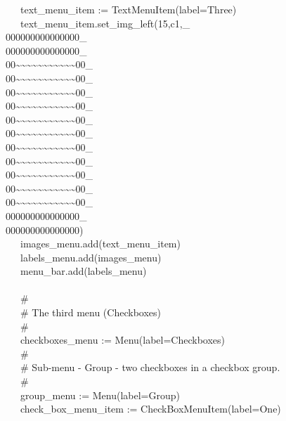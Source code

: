 {\>   \ \ \ text\_menu\_item :=
TextMenuItem({\textquotedbl}label=Three{\textquotedbl}) \\
\>   \ \ \ text\_menu\_item.set\_img\_left({\textquotedbl}15,c1,\_ \\
000000000000000\_ \\
000000000000000\_ \\
00\~{}\~{}\~{}\~{}\~{}\~{}\~{}\~{}\~{}\~{}\~{}00\_ \\
00\~{}\~{}\~{}\~{}\~{}\~{}\~{}\~{}\~{}\~{}\~{}00\_ \\
00\~{}\~{}\~{}\~{}\~{}\~{}\~{}\~{}\~{}\~{}\~{}00\_ \\
00\~{}\~{}\~{}\~{}\~{}\~{}\~{}\~{}\~{}\~{}\~{}00\_ \\
00\~{}\~{}\~{}\~{}\~{}\~{}\~{}\~{}\~{}\~{}\~{}00\_ \\
00\~{}\~{}\~{}\~{}\~{}\~{}\~{}\~{}\~{}\~{}\~{}00\_ \\
00\~{}\~{}\~{}\~{}\~{}\~{}\~{}\~{}\~{}\~{}\~{}00\_ \\
00\~{}\~{}\~{}\~{}\~{}\~{}\~{}\~{}\~{}\~{}\~{}00\_ \\
00\~{}\~{}\~{}\~{}\~{}\~{}\~{}\~{}\~{}\~{}\~{}00\_ \\
00\~{}\~{}\~{}\~{}\~{}\~{}\~{}\~{}\~{}\~{}\~{}00\_ \\
00\~{}\~{}\~{}\~{}\~{}\~{}\~{}\~{}\~{}\~{}\~{}00\_ \\
000000000000000\_ \\
000000000000000{\textquotedbl}) \\
\>   \ \ \ images\_menu.add(text\_menu\_item) \\
\>   \ \ \ labels\_menu.add(images\_menu) \\
\>   \ \ \ menu\_bar.add(labels\_menu) \\
\ \\
\>   \ \ \ \# \\
\>   \ \ \ \# The third menu
({\textquotedbl}Checkboxes{\textquotedbl}) \\
\>   \ \ \ \# \\
\>   \ \ \ checkboxes\_menu :=
Menu({\textquotedbl}label=Checkboxes{\textquotedbl}) \\
\>   \ \ \ \# \\
\>   \ \ \ \# Sub-menu - {\textquotedbl}Group{\textquotedbl} - two
checkboxes in a checkbox group. \\
\>   \ \ \ \# \\
\>   \ \ \ group\_menu :=
Menu({\textquotedbl}label=Group{\textquotedbl}) \\
\>   \ \ \ check\_box\_menu\_item :=
CheckBoxMenuItem({\textquotedbl}label=One{\textquotedbl}) \\
}
